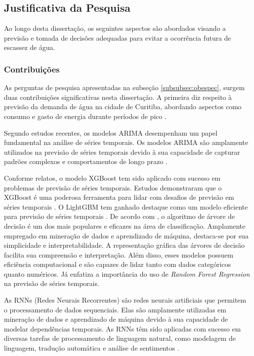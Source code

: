 \subsection{Justificativa da Pesquisa} \label{subsec:justif}

Ao longo desta dissertação, os seguintes aspectos são abordados visando a previsão e tomada de decisões adequadas para evitar a ocorrência futura de escassez de água.

\subsubsection{Contribui\c c\~oes} \label{subsubsec:Contribuição}

As perguntas de pesquisa apresentadas na subseção \ref{subsubsec:obespec}, surgem duas contribuições significativas nesta dissertação. A primeira diz respeito à previsão da demanda de água na cidade de Curitiba, abordando aspectos como consumo e gasto de energia durante períodos de pico .

Segundo estudos recentes, os modelos ARIMA desempenham um papel fundamental na análise de séries temporais. Os modelos ARIMA são amplamente utilizados na previsão de séries temporais devido à sua capacidade de capturar padrões complexos e comportamentos de longo prazo \cite{arima_python}.

Conforme relatos, o modelo XGBoost tem sido aplicado com sucesso em problemas de previsão de séries temporais. Estudos demonstraram que o XGBoost é uma poderosa ferramenta para lidar com desafios de previsão em séries temporais \cite{xgboost_intro}. O LightGBM tem ganhado destaque como um modelo eficiente para previsão de séries temporais \cite{lightgbm_forecasting}. De acordo com , o algoritmo de árvore de decisão é um dos mais populares e eficazes na área de classificação. Amplamente empregado em mineração de dados e aprendizado de máquina, destaca-se por sua simplicidade e interpretabilidade. A representação gráfica das árvores de decisão facilita sua compreensão e interpretação. Além disso, esses modelos possuem eficiência computacional e são capazes de lidar tanto com dados categóricos quanto numéricos. Já  enfatiza a importância do uso de \textit{Random Forest Regression} na previsão de séries temporais.

As RNNs (Redes Neurais Recorrentes) são redes neurais artificiais que permitem o processamento de dados sequenciais. Elas são amplamente utilizadas em mineração de dados e aprendizado de máquina devido à sua capacidade de modelar dependências temporais. As RNNs têm sido aplicadas com sucesso em diversas tarefas de processamento de linguagem natural, como modelagem de linguagem, tradução automática e análise de sentimentos \cite{rnn}.
		
